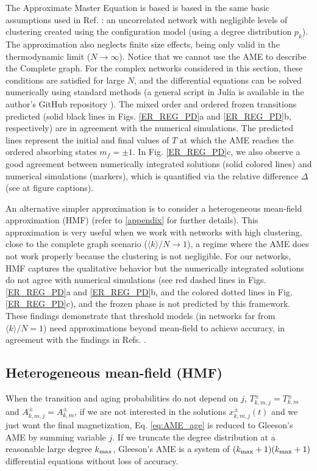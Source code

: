 The Approximate Master Equation is based is based in the same basic assumptions used in Ref. \cite{gleeson-2013}: an uncorrelated network with negligible levels of clustering created using the configuration model \cite{newman-2001} (using a degree distribution $p_k$). The approximation also neglects finite size effects, being only valid in the thermodynamic limit ($N \to \infty$). Notice that we cannot use the AME to describe the Complete graph. For the complex networks considered in this section, these conditions are satisfied for large $N$, and the differential equations can be solved numerically using standard methods (a general script in Julia is available in the author's GitHub repository \cite{link_git}). The mixed order and ordered frozen transitions predicted (solid black lines in Figs. \ref{ER_REG_PD}a and \ref{ER_REG_PD}b, respectively) are in agreement with the numerical simulations. The predicted lines represent the initial and final values of $T$ at which the AME reaches the ordered absorbing states $m_f = \pm 1$. In Fig. \ref{ER_REG_PD}c, we also observe a good agreement between numerically integrated solutions (solid colored lines) and numerical simulations (markers), which is quantified via the relative difference $\Delta$ (see at figure captions).

An alternative simpler approximation is to consider a heterogeneous mean-field approximation (HMF) (refer to \ref{appendix} for further details). This approximation is very useful when we work with networks with high clustering, close to the complete graph scenario ($\langle k \rangle /N \to 1$), a regime where the AME does not work properly because the clustering is not negligible. For our networks, HMF captures the qualitative behavior but the numerically integrated solutions do not agree with numerical simulations (see red dashed lines in Figs. \ref{ER_REG_PD}a and \ref{ER_REG_PD}b, and the colored dotted lines in Fig. \ref{ER_REG_PD}c), and the frozen phase is not predicted by this framework. These findings demonstrate that threshold models (in networks far from $\langle k \rangle/N = 1$) need approximations beyond mean-field to achieve accuracy, in agreement with the findings in Refs. \cite{gleeson-2007,gleeson-2013,Abella-2022-AME}.

\subsection{\label{appendix} Heterogeneous mean-field (HMF)}

When the transition and aging probabilities do not depend on $j$, $T^{\pm}_{k,m,j} = T^{\pm}_{k,m}$ and $A^{\pm}_{k,m,j} = A^{\pm}_{k,m}$, if we are not interested in the solutions $x^{\pm}_{k,m,j} (t)$ and we just want the final magnetization, Eq. \ref{eq:AME_age} is reduced to Gleeson's AME \cite{gleeson-2013} by summing variable $j$. If we truncate the degree distribution at a reasonable large degree $k_{\rm max}$, Gleeson's AME is a system of $(k_{\rm max}+1)(k_{\rm max}+1)$ differential equations without loss of accuracy.

